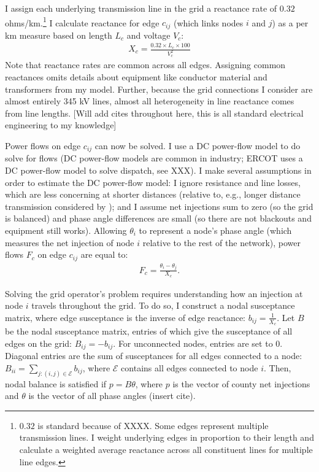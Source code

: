 \documentclass[12pt]{article}
\begin{document}
I assign each underlying transmission line in the grid a reactance rate of $0.32$ ohms/km.\footnote{$0.32$ is standard because of XXXX. Some edges represent multiple transmission lines. I weight underlying edges in proportion to their length and calculate a weighted average reactance across all constituent lines for multiple line edges.} I calculate reactance for edge $c_{ij}$ (which links nodes $i$ and $j$) as a per km measure based on length $L_c$ and voltage $V_c$:
\begin{align}
    X_c = \frac{0.32 \times L_c \times 100}{V_c^2}
\end{align}
Note that reactance rates are common across all edges. Assigning common reactances omits details about equipment like conductor material and transformers from my model. Further, because the grid connections I consider are almost entirely 345 kV lines, almost all heterogeneity in line reactance comes from line lengths. [Will add cites throughout here, this is all standard electrical engineering to my knowledge]

Power flows on edge $c_{ij}$ can now be solved. I use a DC power-flow model to do solve for flows (DC power-flow models are common in industry; ERCOT uses a DC power-flow model to solve dispatch, see XXX). I make several assumptions in order to estimate the DC power-flow model: I ignore resistance and line losses, which are less concerning at shorter distances (relative to, e.g., longer distance transmission considered by \cite{Hausman2024}); and I assume net injections sum to zero (so the grid is balanced) and phase angle differences are small (so there are not blackouts and equipment still works). Allowing $\theta_i$ to represent a node's phase angle (which measures the net injection of node $i$ relative to the rest of the network), power flows $F_c$ on edge $c_{ij}$ are equal to:
\begin{align}
    F_c = \frac{\theta_i - \theta_j}{X_c}.
\end{align}

Solving the grid operator's problem requires understanding how an injection at node $i$ travels throughout the grid. To do so, I construct a nodal susceptance matrix, where edge susceptance is the inverse of edge reactance: $b_{ij} = \frac{1}{X_c}$. Let $B$ be the nodal susceptance matrix, entries of which give the susceptance of all edges on the grid: $B_{ij} = -b_{ij}$. For unconnected nodes, entries are set to 0. Diagonal entries are the sum of susceptances for all edges connected to a node: $B_{ii} = \sum_{j:(i,j)\in \mathcal{E}} b_{ij}$, where $\mathcal{E}$ contains all edges connected to node $i$. Then, nodal balance is satisfied if $p = B\theta$, where $p$ is the vector of county net injections and $\theta$ is the vector of all phase angles (insert cite). 
\end{document}

